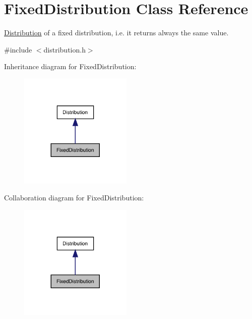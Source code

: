 \hypertarget{class_fixed_distribution}{}\section{Fixed\+Distribution Class Reference}
\label{class_fixed_distribution}


\mbox{\hyperlink{class_distribution}{Distribution}} of a fixed distribution, i.\+e. it returns always the same value.  




{\ttfamily \#include $<$distribution.\+h$>$}



Inheritance diagram for Fixed\+Distribution\+:
\nopagebreak
\begin{figure}[H]
\begin{center}
\leavevmode
\includegraphics[width=152pt]{class_fixed_distribution__inherit__graph}
\end{center}
\end{figure}


Collaboration diagram for Fixed\+Distribution\+:
\nopagebreak
\begin{figure}[H]
\begin{center}
\leavevmode
\includegraphics[width=152pt]{class_fixed_distribution__coll__graph}
\end{center}
\end{figure}
